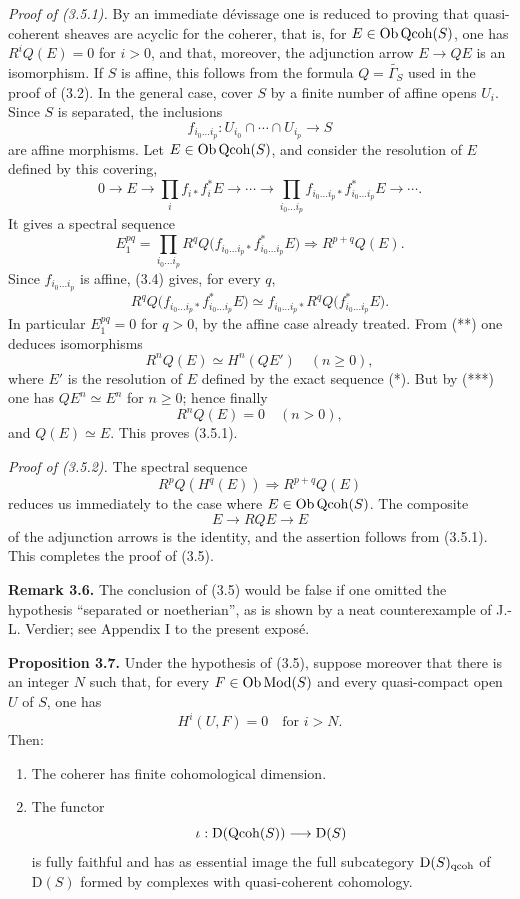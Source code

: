 \documentclass[11pt]{article}
\begin{document}
\emph{Proof of (3.5.1).} By an immediate dévissage one is reduced to proving that quasi-coherent sheaves are acyclic for the coherer, that is, for $E\in\operatorname{Ob}\operatorname{Qcoh}(S)$, one has $R^iQ(E)=0$ for $i>0$, and that, moreover, the adjunction arrow $E\to QE$ is an isomorphism. If $S$ is affine, this follows from the formula $Q=\widetilde{\Gamma_S}$ used in the proof of (3.2). In the general case, cover $S$ by a finite number of affine opens $U_i$. Since $S$ is separated, the inclusions
\[
 f_{i_0\ldots i_p}:U_{i_0}\cap\cdots\cap U_{i_p}\longrightarrow S
\]
are affine morphisms. Let $E\in\operatorname{Ob}\operatorname{Qcoh}(S)$, and consider the resolution of $E$ defined by this covering,
\begin{equation}\tag{*}
 0\longrightarrow E\longrightarrow \prod_i f_{i*}f_i^*E\longrightarrow\cdots\longrightarrow
 \prod_{i_0\ldots i_p}f_{i_0\ldots i_p*}f_{i_0\ldots i_p}^*E\longrightarrow\cdots .
\end{equation}
It gives a spectral sequence
\begin{equation}\tag{**}
 E_1^{pq}=\prod_{i_0\ldots i_p}R^qQ\bigl(f_{i_0\ldots i_p*}f_{i_0\ldots i_p}^*E\bigr)
 \Longrightarrow R^{p+q}Q(E).
\end{equation}
Since $f_{i_0\ldots i_p}$ is affine, (3.4) gives, for every $q$,
\begin{equation}\tag{***}
 R^qQ\bigl(f_{i_0\ldots i_p*}f_{i_0\ldots i_p}^*E\bigr)
 \simeq f_{i_0\ldots i_p*}R^qQ\bigl(f_{i_0\ldots i_p}^*E\bigr).
\end{equation}
In particular $E_1^{pq}=0$ for $q>0$, by the affine case already treated. From (**) one deduces isomorphisms
\[
 R^nQ(E)\simeq H^n(QE')\quad(n\geq0),
\]
where $E'$ is the resolution of $E$ defined by the exact sequence (*). But by (***) one has $QE^n\simeq E^n$ for $n\geq0$; hence finally
\[
 R^nQ(E)=0\quad(n>0),
\]
and $Q(E)\simeq E$. This proves (3.5.1).

\emph{Proof of (3.5.2).} The spectral sequence
\[
 R^pQ(H^q(E))\Longrightarrow R^{p+q}Q(E)
\]
reduces us immediately to the case where $E\in\operatorname{Ob}\operatorname{Qcoh}(S)$. The composite
\[
 E\longrightarrow RQE\longrightarrow E
\]
of the adjunction arrows is the identity, and the assertion follows from (3.5.1). This completes the proof of (3.5).

\textbf{Remark 3.6.} The conclusion of (3.5) would be false if one omitted the hypothesis ``separated or noetherian'', as is shown by a neat counterexample of J.-L. Verdier; see Appendix I to the present exposé.

\textbf{Proposition 3.7.} Under the hypothesis of (3.5), suppose moreover that there is an integer $N$ such that, for every $F\in\operatorname{Ob}\operatorname{Mod}(S)$ and every quasi-compact open $U$ of $S$, one has
\[
 H^i(U,F)=0\quad\text{for }i>N.
\]
Then:
\begin{enumerate}[label=\alph*)]
\item The coherer has finite cohomological dimension.
\item The functor
\[
 \iota:\mathrm D(\operatorname{Qcoh}(S))\longrightarrow \mathrm D(S)
\]
is fully faithful and has as essential image the full subcategory $\mathrm D(S)_{\mathrm{qcoh}}$ of $\mathrm D(S)$ formed by complexes with quasi-coherent cohomology.
\end{enumerate}
\end{document}
